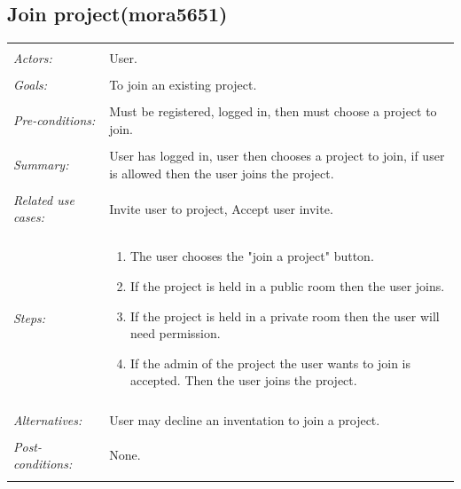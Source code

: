 \documentclass[11pt]{report}
\begin{document}
\begin{IDE-like Features}
\begin{}
\begin{Collaborative features that would be "nice":}
\subsection{Join project(mora5651)}
\begin{tabular}{ p{2cm} p{12cm} }
\hline
\\
\textit{Actors:} & User.\\
\\
\textit{Goals:} & To join an existing project.\\
\\
\textit{Pre-conditions:} & Must be registered, logged in, then must choose a project to join.\\
\\
\textit{Summary:} & User has logged in, user then chooses a project to join, if user is allowed then the user joins the project. \\
\\
\textit{Related use cases:} & Invite user to project, Accept user invite. \\
\\
\textit{Steps:} & \begin{enumerate}
 \item The user chooses the "join a project" button. 
 \item If the project is held in a public room then the user joins. 
 \item If the project is held in a private room then the user will need permission. 
 \item If the admin of the project the user wants to join is accepted. Then the user joins the project. 
\end{enumerate}\\
\\
\textit{Alternatives:} & User may decline an inventation to join a project. \\
\\
\textit{Post-conditions:} & None. \\
\\
\hline
\end{tabular}


\end{Collaborative features that would be "nice":}
\end{}
\end{IDE-like Features}
\end{document}
